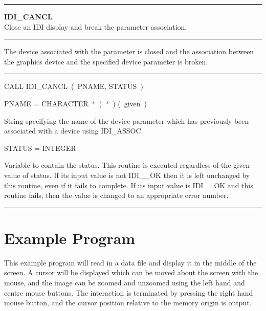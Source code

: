 \parbox{160mm}{

\rule{160mm}{0.5mm}

\hspace*{10mm}\parbox{140mm}{
{\bf IDI\_CANCL\label{IDI_CANCL}} \\
Close an IDI display and break the parameter association.}

\rule{160mm}{0.1mm}

\hspace*{10mm}\parbox{140mm}{
The device associated with the parameter is closed and the association
between the graphics device and the specified device parameter is broken.}

\rule{160mm}{0.1mm}

\hspace*{10mm}\parbox{140mm}{
CALL IDI\_CANCL~(~PNAME, STATUS~)}

\hspace*{10mm}\parbox{140mm}{
PNAME = CHARACTER~*~(~*~) \hspace{10mm} (~given~)}

\hspace*{30mm}\parbox{120mm}{
String specifying the name of the device parameter which has previously
been associated with a device using IDI\_ASSOC.}

\hspace*{10mm}\parbox{140mm}{
STATUS = INTEGER}

\hspace*{30mm}\parbox{120mm}{
Variable to contain the status. This routine is executed regardless of the
given value of status. If its input value is not IDI\_\_OK then it is left
unchanged by this routine, even if it fails to complete. If its input value
is IDI\_\_OK and this routine fails, then the value is changed to an
appropriate error number.}

\rule{160mm}{0.5mm}
}


\newpage
\section{Example Program}
\label{se:exp}

This example program will read in a data file and display it in the
middle of the screen. A cursor will be displayed which can be
moved about the screen with the mouse, and the image can be zoomed
and unzoomed using the left hand and centre mouse buttons. The
interaction is terminated by pressing the right hand mouse button, and
the cursor position relative to the memory origin is output.

